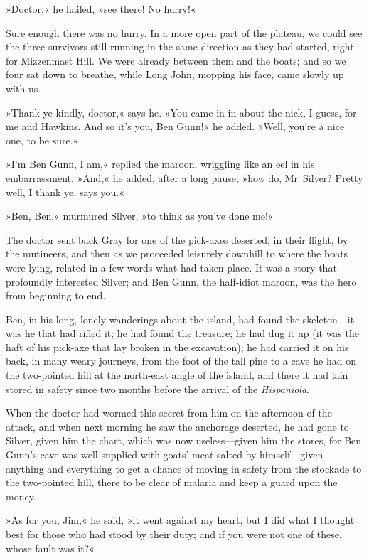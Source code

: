 »Doctor,« he hailed, »see there! No hurry!«

Sure enough there was no hurry. In a more open part of the plateau, we could see the three survivors still running in the same direction as they had started, right for Mizzenmast Hill. We were already between them and the boats; and so we four sat down to breathe, while Long John, mopping his face, came slowly up with us.

»Thank ye kindly, doctor,« says he. »You came in in about the nick, I guess, for me and Hawkins. And so it's you, Ben Gunn!« he added. »Well, you're a nice one, to be sure.«

»I'm Ben Gunn, I am,« replied the maroon, wriggling like an eel in his embarrassment. »And,« he added, after a long pause, »how do, Mr~Silver? Pretty well, I thank ye, says you.«

»Ben, Ben,« murmured Silver, »to think as you've done me!«

The doctor sent back Gray for one of the pick-axes deserted, in their flight, by the mutineers, and then as we proceeded leisurely downhill to where the boats were lying, related in a few words what had taken place. It was a story that profoundly interested Silver; and Ben Gunn, the half-idiot maroon, was the hero from beginning to end.

Ben, in his long, lonely wanderings about the island, had found the skeleton—it was he that had rifled it; he had found the treasure; he had dug it up (it was the haft of his pick-axe that lay broken in the excavation); he had carried it on his back, in many weary journeys, from the foot of the tall pine to a cave he had on the two-pointed hill at the north-east angle of the island, and there it had lain stored in safety since two months before the arrival of the \textit{Hispaniola}.

When the doctor had wormed this secret from him on the afternoon of the attack, and when next morning he saw the anchorage deserted, he had gone to Silver, given him the chart, which was now useless—given him the stores, for Ben Gunn's cave was well supplied with goats' meat salted by himself—given anything and everything to get a chance of moving in safety from the stockade to the two-pointed hill, there to be clear of malaria and keep a guard upon the money.

»As for you, Jim,« he said, »it went against my heart, but I did what I thought best for those who had stood by their duty; and if you were not one of these, whose fault was it?«

